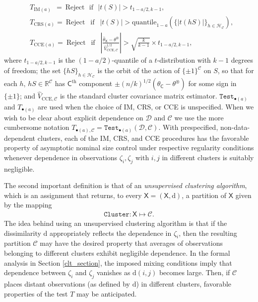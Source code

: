 \documentclass[preprint]{imsart}
\numberwithin{equation}{section}
\theoremstyle{plain}
\theoremstyle{definition}
\renewcommand{\(}{\left(}
\renewcommand{\)}{\right)}
\renewcommand{\[}{\left[}
\renewcommand{\]}{\right]}
\renewcommand{\hat}{\widehat}
\newcommand{\G}{k}
\newcommand{\Test}{\mathtt{Test}}
\renewcommand{\hat}{\widehat}
\begin{document}
{\begin{align}
	&T_{\text{IM}(a)} \ \ = \ \text{Reject}  \ \ \ \text{if} \ \ \ \left | t(S) \right | >t_{1-a/2,\G-1}, \\
	&T_{\text{CRS}(a)} = \ \text{Reject} \ \ \text{ if } \ \ \left | t(S) \right | >  \mathrm{quantile}_{1-a} ( \{   | t(hS)  | \rbrace_{h\in \mathcal H_{\mathcal C}} ),\\
	&T_{\text{CCE}(a)} = \ \text{Reject} \ \ \text{ if } \ \ \left | \frac{ \hat \theta_{\mathsf X}-\theta^\circledast}{ \hat V_{\text{CCE}, \mathcal C}^{1/2}} \right | > \sqrt{\frac{\G}{\G-1}} \times t_{1-a/2,\G-1},
\end{align}
where $t_{1-a/2,\G-1}$ is the $(1-a/2)$-quantile of a $t$-distribution with $\G-1$ degrees of freedom; the set $\{ h S \}_{h \in \mathcal H_{\mathcal C}}$ is the orbit of the action of $\{ \pm 1\}^{\mathcal C}$ on $S$, so that for each $h$,  $hS \in \mathbb R^{\mathcal C}$ has $\mathsf C^{\text{th}}$ component 
$\pm (n/\G)^{1/2}(\hat \theta_{ \mathsf C} - \theta^\circledast)$ for some sign in $\{\pm 1\}$; and $\hat V_{\text{CCE},\mathcal C}$ is the standard cluster covariance matrix estimator. $\Test_{\bullet(a)}$ and $T_{\bullet(a)}$ are used when the choice of IM, CRS, or CCE is unspecified. When we wish to be clear about explicit dependence on $\mathscr D$ and $\mathcal C$ we use the more cumbersome notation $T_{\bullet(a), \mathcal C} = \Test_{\bullet(a)}(\mathscr D, \mathcal C)$.
With prespecified, non-data-dependent clusters, each of the IM, CRS, and CCE procedures has the favorable property of asymptotic nominal size control under respective regularity conditions whenever dependence in observations $\zeta_i, \zeta_j$ with $i,j$ in different clusters is suitably negligible.  


The second important definition is that of an \textit{unsupervised clustering algorithm}, which is an assignment that returns, to every $\mathsf X = (\mathsf X,\mathrm d)$, a partition of $\mathsf X$ given by the mapping 
\begin{align} \mathtt{Cluster}: \mathsf X \mapsto \mathcal C. \end{align} 
The idea behind using an unsupervised clustering algorithm is that if the dissimilarity $\mathrm d$ appropriately reflects the dependence in $\zeta_i$, then the resulting partition $\mathcal C$ may have the desired property that averages of observations belonging to different clusters exhibit negligible dependence. In the formal analysis in Section \ref{clt_section}, the imposed mixing conditions imply that dependence between $\zeta_i$ and $\zeta_j$ vanishes as $\mathrm{d}(i,j)$ becomes large. Then, if $\mathcal C$ places distant observations (as defined by $\mathrm d$) in different clusters, favorable properties of the test $T$ may be anticipated. 

}
\end{document}
